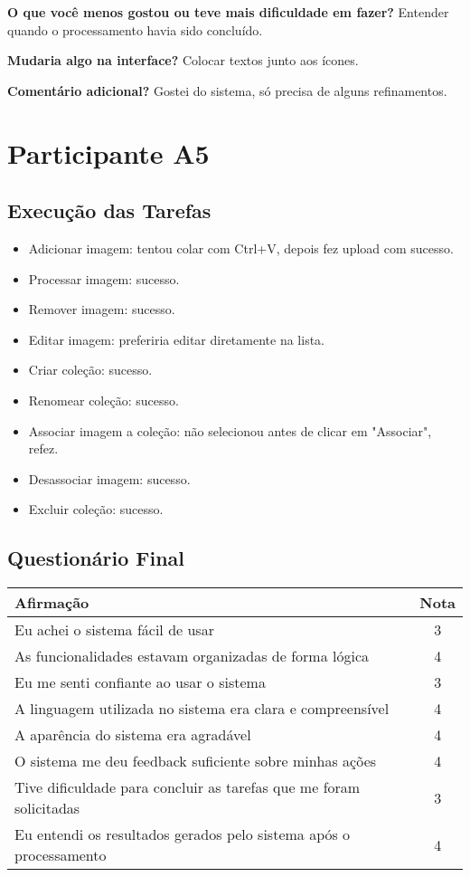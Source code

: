 \textbf{O que você menos gostou ou teve mais dificuldade em fazer?} Entender quando o processamento havia sido concluído.

\textbf{Mudaria algo na interface?} Colocar textos junto aos ícones.

\textbf{Comentário adicional?} Gostei do sistema, só precisa de alguns refinamentos.

\newpage
\section*{Participante A5}

\subsection*{Execução das Tarefas}
\begin{itemize}
    \item Adicionar imagem: tentou colar com Ctrl+V, depois fez upload com sucesso.
    \item Processar imagem: sucesso.
    \item Remover imagem: sucesso.
    \item Editar imagem: preferiria editar diretamente na lista.
    \item Criar coleção: sucesso.
    \item Renomear coleção: sucesso.
    \item Associar imagem a coleção: não selecionou antes de clicar em "Associar", refez.
    \item Desassociar imagem: sucesso.
    \item Excluir coleção: sucesso.
\end{itemize}

\newpage

\subsection*{Questionário Final}
\begin{center}
\begin{tabular}{|p{10cm}|c|}
\hline
\textbf{Afirmação} & \textbf{Nota} \\
\hline
Eu achei o sistema fácil de usar & 3 \\
As funcionalidades estavam organizadas de forma lógica & 4 \\
Eu me senti confiante ao usar o sistema & 3 \\
A linguagem utilizada no sistema era clara e compreensível & 4 \\
A aparência do sistema era agradável & 4 \\
O sistema me deu feedback suficiente sobre minhas ações & 4 \\
Tive dificuldade para concluir as tarefas que me foram solicitadas & 3 \\
Eu entendi os resultados gerados pelo sistema após o processamento & 4 \\
\hline
\end{tabular}
\end{center}

